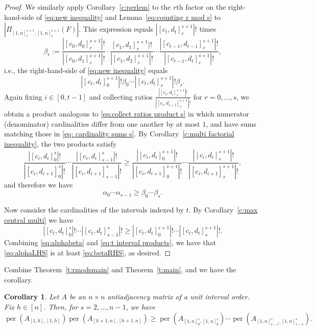 \documentclass[12pt]{amsart}
\newtheorem{cor}[thm]{Corollary}
\theoremstyle{definition}
\numberwithin{equation}{section}
\DeclareMathOperator{\perm}{per}
\begin{document}
\begin{proof}
We similarly apply Corollary~\ref{c:perlem} to the $r$th factor on the right-hand-side of \eqref{eq:new inequality} and Lemma~\ref{eq:counting r mod s} to $|\Pi_{[1,n]_r^{s+1},[1,n]_r^{s+1}} (F)|$. This expression equals $|[c_t,d_t]_r^{s+1}|!$ times \begin{equation}
   \beta_r:= \frac{ |[c_0,d_0]_{r}^{s+1}|!}{|[c_0,d_1]_{r}^{s+1}|!} \cdot \frac{[c_1,d_1]_{r}^{s+1}|!}{|[c_1,d_2]_r^{s+1}|!} \cdots \frac{|[c_{t-1},d_{t-1}]_{r}^{s+1}|!}{|[c_{t-1},d_{t}]_r^{s+1}|!},
\end{equation}
 i.e., the right-hand-side of \eqref{eq:new inequality} equals
\begin{equation}\label{eq:betaRHS}
    |[c_t,d_t]_0^{s+1}|!\beta_0\cdots |[c_t, d_t]_{s}^{s+1}|!\beta_{s}.
\end{equation}
 Again fixing $i \in [0,t-1]$ and collecting ratios
 $\frac{|[c_i, d_i]_r^{s+1}|!}{|[c_i,d_{i+1}]_r^{s+1}|!}$ for $r=0, \dotsc, s$, we obtain a product analogous to \eqref{eq:collect ratios product s} in which numerator (denominator) cardinalities differ from one another by at most $1$, and have sums matching those in \eqref{eq: cardinality sums s}.
By Corollary~\ref{c:multi factorial inequality}, the two products satisfy
\begin{equation}
    \frac{ |[c_i,d_i]_{0}^{s}|!}{|[c_i,d_{i+1}]_{0}^{s}|!} \cdots \frac{|[c_{i},d_{i}]_{s-1}^{s}|!}{|[c_{i},d_{i+1}]_{s-1}^s|!} \geq \frac{ |[c_i,d_i]_{0}^{s+1}|!}{|[c_i,d_{i+1}]_{0}^{s+1}|!} \cdots \frac{|[c_{i},d_{i}]_{s}^{s+1}|!}{|[c_{i},d_{i+1}]_{s}^{s+1}|!},
\end{equation}
and therefore we have
\begin{equation}\label{eq:alphabeta}
    \alpha_0\cdots\alpha_{s-1}\geq \beta_0\cdots\beta_s.
\end{equation}

Now consider the cardinalities of the intervals indexed by $t$. By Corollary~\ref{c:max central multi} we have
\begin{equation}\label{eq:t interval products}
    |[c_t, d_t]_0^s|! \cdots |[c_t, d_t]_{s-1}^s|! \geq |[c_t, d_t]_0^{s+1}|! \cdots |[c_t, d_t]_{s}^{s+1}|!.
\end{equation}
Combining \eqref{eq:alphabeta} and \eqref{eq:t interval products}, we have that \eqref{eq:alphaLHS} is at least \eqref{eq:betaRHS}, as desired.
\end{proof}

Combine Theorem~\ref{t:rmodsmain} and Theorem~\ref{t:main}, and we have the corollary.
\begin{cor}
    Let $A$ be an $n\times n$ antiadjacency matrix of a unit interval order. Fix $h \in [n]$. Then, for $s=2,\dotsc,n-1$, we have \begin{equation*}
        \perm(A_{[1,h],[1,h]})\perm(A_{[h+1,n],[h+1,n]}) \geq \perm(A_{[1,n]_0^s,[1,n]_0^s})\cdots \perm(A_{[1,n]_{s-1}^s,[1,n]_{s-1}^s}).
    \end{equation*}
\end{cor}
\end{document}
